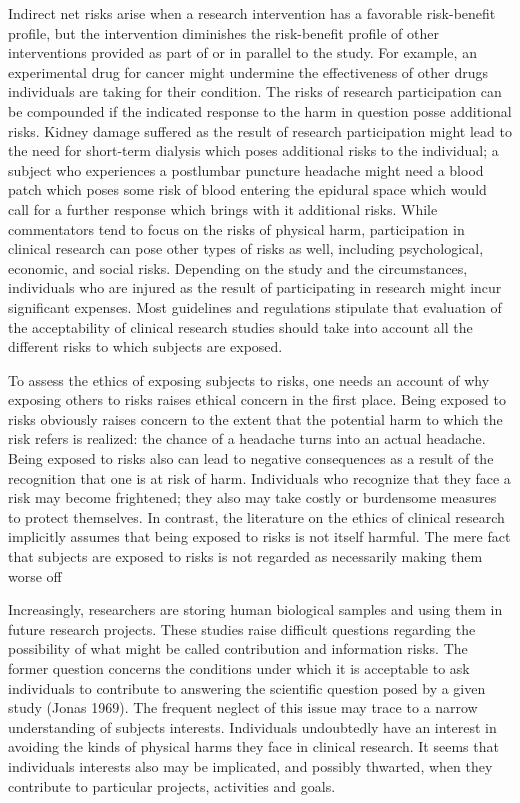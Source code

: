 \documentclass[12p]{article}
\begin{document}
Indirect net risks arise when a research intervention has a favorable risk-benefit profile, but the intervention diminishes the risk-benefit profile of other interventions provided as part of or in parallel to the study. For example, an experimental drug for cancer might undermine the effectiveness of other drugs individuals are taking for their condition. The risks of research participation can be compounded if the indicated response to the harm in question posse additional risks. Kidney damage suffered as the result of research participation might lead to the need for short-term dialysis which poses additional risks to the individual; a subject who experiences a postlumbar puncture headache might need a blood patch which poses some risk of blood entering the epidural space which would call for a further response which brings with it additional risks. While commentators tend to focus on the risks of physical harm, participation in clinical research can pose other types of risks as well, including psychological, economic, and social risks. Depending on the study and the circumstances, individuals who are injured as the result of participating in research might incur significant expenses. Most guidelines and regulations stipulate that evaluation of the acceptability of clinical research studies should take into account all the different risks to which subjects are exposed.

To assess the ethics of exposing subjects to risks, one needs an account of why exposing others to risks raises ethical concern in the first place. Being exposed to risks obviously raises concern to the extent that the potential harm to which the risk refers is realized: the chance of a headache turns into an actual headache. Being exposed to risks also can lead to negative consequences as a result of the recognition that one is at risk of harm. Individuals who recognize that they face a risk may become frightened; they also may take costly or burdensome measures to protect themselves. In contrast, the literature on the ethics of clinical research implicitly assumes that being exposed to risks is not itself harmful. The mere fact that subjects are exposed to risks is not regarded as necessarily making them worse off

Increasingly, researchers are storing human biological samples and using them in future research projects. These studies raise difficult questions regarding the possibility of what might be called contribution and information risks. The former question concerns the conditions under which it is acceptable to ask individuals to contribute to answering the scientific question posed by a given study (Jonas 1969). The frequent neglect of this issue may trace to a narrow understanding of subjects interests. Individuals undoubtedly have an interest in avoiding the kinds of physical harms they face in clinical research. It seems that individuals interests also may be implicated, and possibly thwarted, when they contribute to particular projects, activities and goals.
\end{document}
